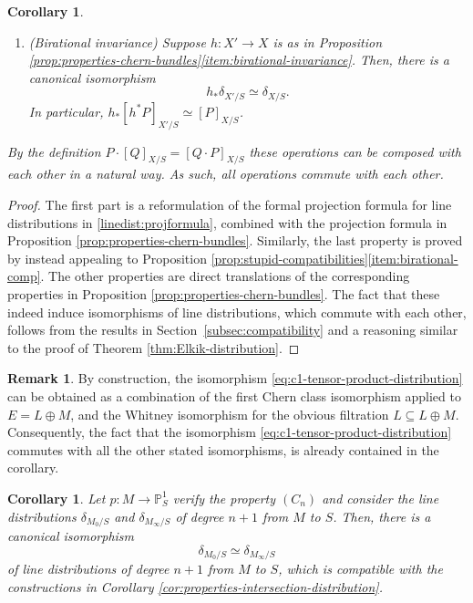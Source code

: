 \documentclass[JEP,XML,SOM,Unicode,published]{cedram}
\newcommand\hto{\mathrel{\lhook\joinrel\to}}
\theoremstyle{plain}
\newtheorem{corollary}[theorem]{Corollary}
\theoremstyle{definition}
\newtheorem{remark}[theorem]{Remark}
\newcommand{\PBbb}{\mathbb P}
\newcommand{\cfrak}{\mathfrak c}
\begin{document}
\begin{corollary}
\begin{enumerate}
\begin{displaymath}
[ \cfrak_r(E) ]_{X/S} \simeq \delta_{Y/S},
\end{displaymath}
where $i\colon Y\hto X$ is the closed immersion of $Y$ in $X$.
\item\label{item:prop-int-dist-birational} (Birational invariance) Suppose $h \colon X' \to X$ is as in Proposition \ref{prop:properties-chern-bundles}\eqref{item:birational-invariance}. Then, there is a canonical isomorphism
\begin{displaymath}
h_\ast \delta_{X'/S}\simeq \delta_{X/S}.
\end{displaymath}
In particular, $h_{\ast}[h^{\ast}P]_{X'/S}\simeq [P]_{X/S}$.
\end{enumerate}
By the definition $P \cdot [Q]_{X/S} = [Q \cdot P]_{X/S}$ these operations can be composed with each other in a natural way. As such, all operations commute with each other.

\end{corollary}

\begin{proof}
The first part is a reformulation of the formal projection formula for line distributions in \eqref{linedist:projformula}, combined with the projection formula in Proposition \ref{prop:properties-chern-bundles}. Similarly, the last property is proved by instead appealing to Proposition \ref{prop:stupid-compatibilities}\eqref{item:birational-comp}. The other properties are direct translations of the corresponding properties in Proposition \ref{prop:properties-chern-bundles}. The fact that these indeed induce isomorphisms of line distributions, which commute with each other, follows from the results in Section~\ref{subsec:compatibility} and a reasoning similar to the proof of Theorem \ref{thm:Elkik-distribution}.
\end{proof}

\begin{remark}
By construction, the isomorphism \eqref{eq:c1-tensor-product-distribution} can be obtained as a combination of the first Chern class isomorphism applied to $E=L\oplus M$, and the Whitney isomorphism for the obvious filtration $L\subseteq L\oplus M$. Consequently, the fact that the isomorphism \eqref{eq:c1-tensor-product-distribution} commutes with all the other stated isomorphisms, is already contained in the corollary.
\end{remark}

\begin{corollary}
Let $p\colon M \to \PBbb^1_S$ verify the property $(C_n)$ and consider the line distributions $\delta_{M_0/S}$ and $\delta_{M_{\infty}/S}$ of degree $n+1$ from $M$ to $S$. Then, there is a canonical isomorphism
\begin{displaymath}
\delta_{M_0/S} \simeq \delta_{M_{\infty}/S}
\end{displaymath}
of line distributions of degree $n+1$ from $M$ to $S$, which is compatible with the constructions in Corollary \ref{cor:properties-intersection-distribution}.
\end{corollary}
\end{document}

